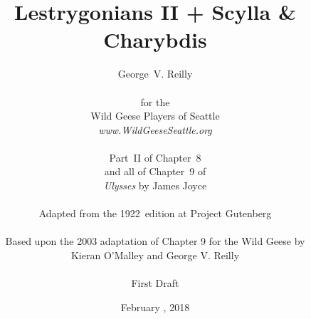 



\title{\Huge Lestrygonians II + Scylla \& Charybdis}
\author{George~V. Reilly\\
\\
{\small for the}\\
Wild Geese Players of Seattle\\
{\emph{www.WildGeeseSeattle.org}}\\
\\
{\small Part~II of Chapter~8}\\
{\small and all of Chapter~9 of}\\
{\small \emph{Ulysses} by James Joyce}\\
\\
{\small Adapted from the 1922~edition at Project Gutenberg}
\\
\\
{\small Based upon the 2003 adaptation of Chapter 9 for the Wild Geese by}\\
{\small Kieran O'Malley and George V. Reilly}\\
\\
{\small First Draft}}
\date{February , 2018}
\raggedbottom



\maketitle
\thispagestyle{empty}
\pagebreak


